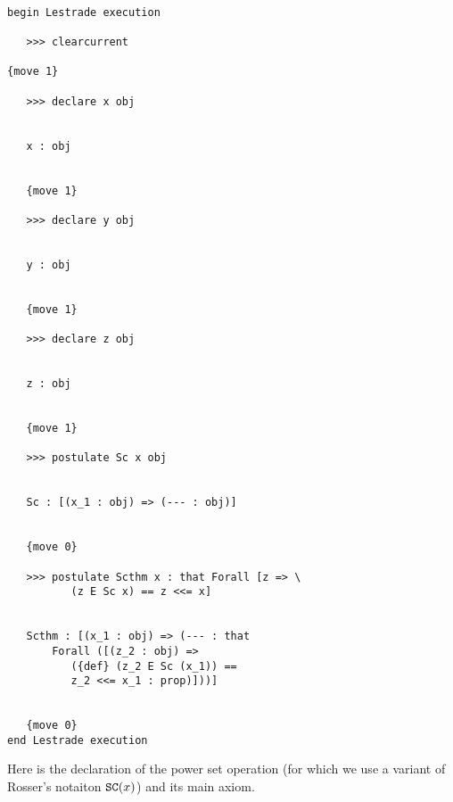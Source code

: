 \documentclass[12pt]{article}
\begin{document}
\begin{verbatim}

begin Lestrade execution

   >>> clearcurrent

{move 1}

   >>> declare x obj


   x : obj


   {move 1}

   >>> declare y obj


   y : obj


   {move 1}

   >>> declare z obj


   z : obj


   {move 1}

   >>> postulate Sc x obj


   Sc : [(x_1 : obj) => (--- : obj)]


   {move 0}

   >>> postulate Scthm x : that Forall [z => \
          (z E Sc x) == z <<= x]


   Scthm : [(x_1 : obj) => (--- : that 
       Forall ([(z_2 : obj) => 
          ({def} (z_2 E Sc (x_1)) == 
          z_2 <<= x_1 : prop)]))]


   {move 0}
end Lestrade execution
\end{verbatim}

Here is the declaration of the power set operation (for which we use a variant of Rosser's notaiton ${\tt SC}(x)$) and its main axiom.
\end{document}
